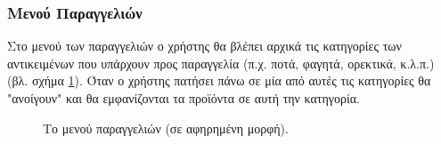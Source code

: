 \documentclass{assignment}
\begin{document}
\subsubsection{Μενού Παραγγελιών}

Στο μενού των παραγγελιών ο χρήστης θα βλέπει αρχικά τις κατηγορίες των αντικειμένων που υπάρχουν προς παραγγελία (π.χ. ποτά, φαγητά, ορεκτικά, κ.λ.π.) (βλ. σχήμα \ref{fig:menu:paraggelia}). Όταν ο χρήστης πατήσει πάνω σε μία από αυτές τις κατηγορίες θα "ανοίγουν" και θα εμφανίζονται τα προϊόντα σε αυτή την κατηγορία. 

\begin{figure}
\begin{center}
\caption{Το μενού παραγγελιών (σε αφηρημένη μορφή).}
\label{fig:menu:paraggelia}
\end{center}
\end{figure}



\end{document}
